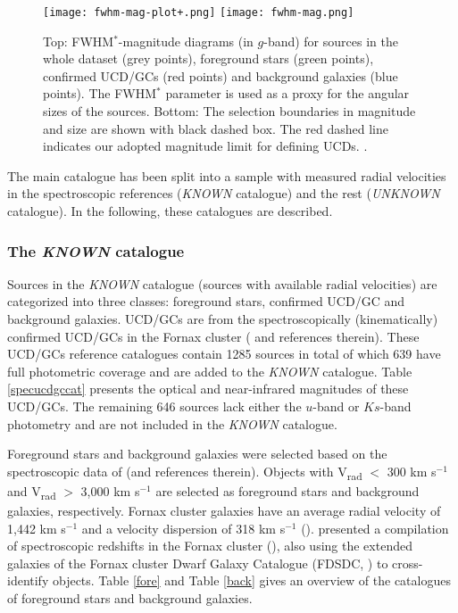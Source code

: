\documentclass[fleqn,usenatbib]{mnras}
\begin{document}
\begin{figure}
\centering
        \texttt{[image: fwhm-mag-plot+.png]}
        \texttt{[image: fwhm-mag.png]}
\caption{Top: FWHM$^*$-magnitude diagrams (in $g$-band) for sources in the whole dataset (grey points), foreground stars (green points), confirmed UCD/GCs (red points) and background galaxies (blue points). The FWHM$^*$ parameter is used as a proxy for the angular sizes of the sources. Bottom: The selection boundaries in magnitude and size are shown with black dashed box. The red dashed line indicates our adopted magnitude limit for defining UCDs.  \citep{drinkwater2000}.}
\label{fwhmmag}
\end{figure} 

The main catalogue has been split into a sample with measured radial velocities in the spectroscopic references (\textit{KNOWN} catalogue) and the rest (\textit{UNKNOWN} catalogue). In the following, these catalogues are described.

\subsubsection{The \textit{KNOWN} catalogue}
Sources in the \textit{KNOWN} catalogue (sources with available radial velocities) are categorized into three classes: foreground stars, confirmed UCD/GC and background galaxies. UCD/GCs are from the spectroscopically (kinematically) confirmed UCD/GCs in the Fornax cluster (\citealp{wittmann-2016,Pota-2018} and references therein). These UCD/GCs reference catalogues contain 1285 sources in total of which 639 have full photometric coverage and are added to the \textit{KNOWN} catalogue. Table \ref{specucdgccat} presents the optical and near-infrared magnitudes of these UCD/GCs. The remaining 646 sources lack either the $u$-band or $Ks$-band photometry and are not included in the \textit{KNOWN} catalogue. 

Foreground stars and background galaxies were selected based on the spectroscopic data of \citet{Maddox-2019} (and references therein). Objects with V\textsubscript{rad} $<$ 300 km s$^{-1}$ and V\textsubscript{rad} $>$ 3,000 km s$^{-1}$ are selected as foreground stars and background galaxies, respectively. Fornax cluster galaxies have an average radial velocity of 1,442 km s$^{-1}$ and a velocity dispersion of 318 km s$^{-1}$ (\citealp{Maddox-2019}). \citet{Maddox-2019} presented a compilation of spectroscopic redshifts in the Fornax cluster (\citealp{Hilker-1999,drinkwater2000,Mieske2004,bergond2007,firth2007,firth2008,gregg2009,schuberth2010}), also using the extended galaxies of the Fornax cluster Dwarf Galaxy Catalogue (FDSDC, \citealp{venhola2018}) to cross-identify objects. Table \ref{fore} and Table \ref{back} gives an overview of the catalogues of foreground stars and background galaxies.
\end{document}

